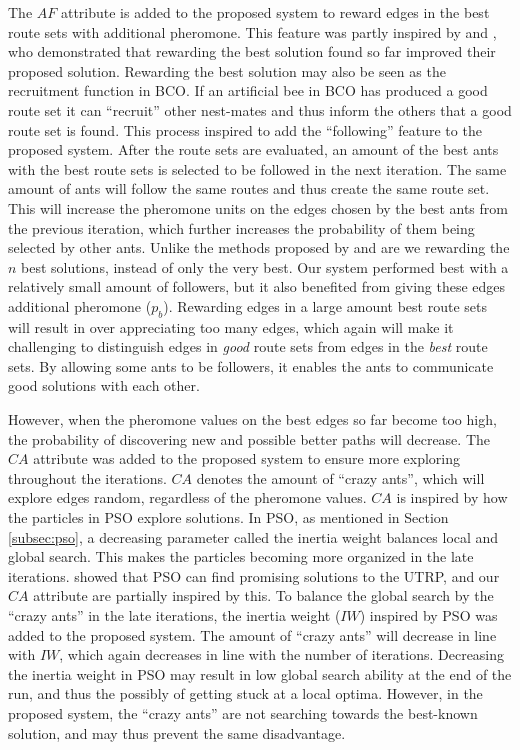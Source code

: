 The $AF$ attribute is added to the proposed system to reward edges in the best route sets with additional pheromone. This feature was partly inspired by \citet{tripathi09} and \citet{sedighpour14}, who demonstrated that rewarding the best solution found so far improved their proposed solution. Rewarding the best solution may also be seen as the recruitment function in BCO. If an artificial bee in BCO has produced a good route set it can ``recruit'' other nest-mates and thus inform the others that a good route set is found. This process inspired to add the ``following'' feature to the proposed system. After the route sets are evaluated, an amount of the best ants with the best route sets is selected to be followed in the next iteration. The same amount of ants will follow the same routes and thus create the same route set. This will increase the pheromone units on the edges chosen by the best ants from the previous iteration, which further increases the probability of them being selected by other ants. Unlike the methods proposed by \citet{tripathi09} and \citet{sedighpour14} are we rewarding the $n$ best solutions, instead of only the very best. Our system performed best with a relatively small amount of followers, but it also benefited from giving these edges additional pheromone ($p_b$). Rewarding edges in a large amount best route sets will result in over appreciating too many edges, which again will make it challenging to distinguish edges in \textit{good} route sets from edges in the \textit{best} route sets. By allowing some ants to be followers, it enables the ants to communicate good solutions with each other. %

However, when the pheromone values on the best edges so far become too high, the probability of discovering new and possible better paths will decrease. The $CA$ attribute was added to the proposed system to ensure more exploring throughout the iterations. $CA$ denotes the amount of ``crazy ants'', which will explore edges random, regardless of the pheromone values. $CA$ is inspired by how the particles in PSO explore solutions. In PSO, as mentioned in Section \vref{subsec:pso}, a decreasing parameter called the inertia weight balances local and global search. This makes the particles becoming more organized in the late iterations. \citet{kechagiopoulos14} showed that PSO can find promising solutions to the UTRP, and our $CA$ attribute are partially inspired by this. To balance the global search by the ``crazy ants'' in the late iterations, the inertia weight ($IW$) inspired by PSO was added to the proposed system. The amount of ``crazy ants'' will decrease in line with $IW$, which again decreases in line with the number of iterations. Decreasing the inertia weight in PSO may result in low global search ability at the end of the run, and thus the possibly of getting stuck at a local optima. However, in the proposed system, the ``crazy ants'' are not searching towards the best-known solution, and may thus prevent the same disadvantage.

